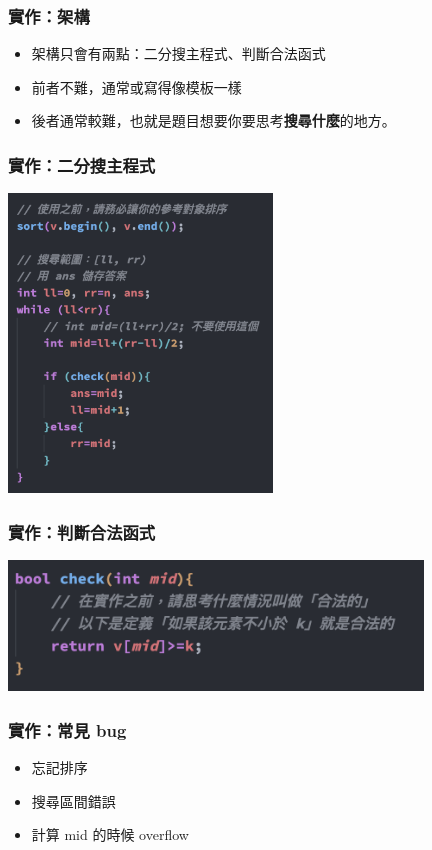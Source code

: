 \documentclass[mathserif]{beamer}
\begin{document}
\begin{frame}
    \frametitle{實作：架構}
    \begin{itemize}
        \item 架構只會有兩點：二分搜主程式、判斷合法函式
        \item<2-> 前者不難，通常或寫得像模板一樣
        \item<2-> 後者通常較難，也就是題目想要你要思考\textbf{搜尋什麼}的地方。
    \end{itemize}
\end{frame}

\begin{frame}
    \frametitle{實作：二分搜主程式}
    \includegraphics[width=7.0cm]{img/bs-main.png}
\end{frame}

\begin{frame}
    \frametitle{實作：判斷合法函式}
    \includegraphics[width=11.0cm]{img/bs-check.png}
\end{frame}

\begin{frame}
    \frametitle{實作：常見 bug}
    \begin{itemize}
        \item 忘記排序
        \item 搜尋區間錯誤
        \item 計算 mid 的時候 overflow
    \end{itemize}
\end{frame}
\end{document}
